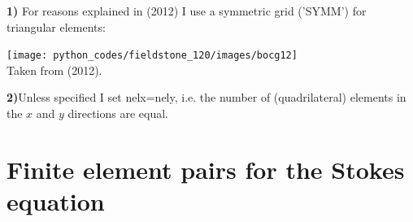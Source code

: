 \begin{remark}
{\bf 1)} For reasons explained in \textcite{bocg12} (2012) I use 
a symmetric grid ('SYMM') for triangular elements:
\begin{center} 
\texttt{[image: python\_codes/fieldstone\_120/images/bocg12]}\\
{\captionfont Taken from \textcite{bocg12} (2012).}
\end{center} 
\end{remark}

\begin{remark}
{\bf 2)}Unless specified I set nelx=nely, i.e. the number of (quadrilateral) elements
in the $x$ and $y$ directions are equal.
\end{remark}

\section*{Finite element pairs for the Stokes equation}

